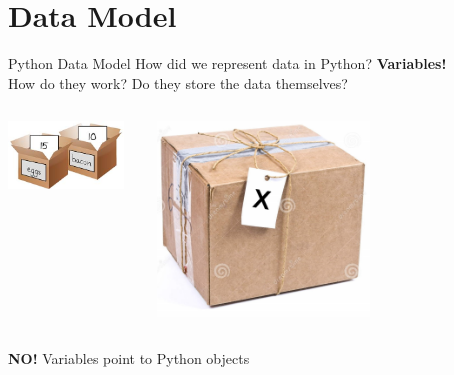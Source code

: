     \section{Data Model}
    \begin{frame}{Python Data Model}
        \pause
        \LARGE
        How did we represent data in Python?
        \pause
         \textbf{Variables!}\\
        \pause
        How do they work?
        \pause
         Do they store the data themselves?
        \pause
        \begin{columns}
            \begin{column}{0.5\textwidth}
                \includegraphics[width=0.9\textwidth]{images/box.jpg}
            \end{column}
            \pause
            \begin{column}{0.5\textwidth}
                \includegraphics[width=0.6\textwidth]{images/box_tag.jpg}
            \end{column}
        \end{columns}
        \pause
        \textbf{NO!} Variables point to Python objects
        
    \end{frame}

